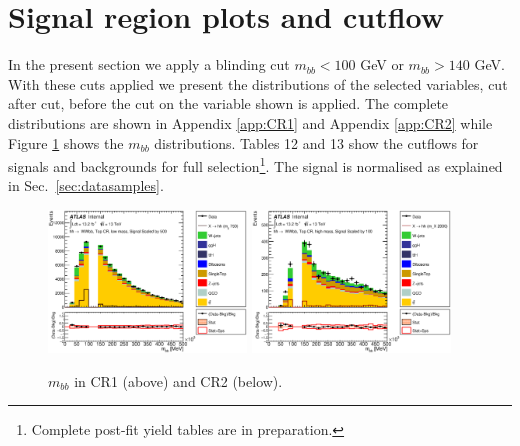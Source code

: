 \section{Signal region plots and cutflow}
\label{sec:dihiggs_plots_cut_flow}

In the present section we apply a blinding cut $m_{bb} < 100$ GeV or
$m_{bb} > 140$ GeV. With these cuts applied we present the distributions
of the selected variables, cut after cut, before the cut on the variable
shown is applied.  The complete distributions are shown in Appendix 
\ref{app:CR1} and Appendix \ref{app:CR2} while Figure \ref{fig:mbbCR1CR2}
shows the $m_{bb}$ distributions. 
Tables 12 and 13 show
the cutflows for signals and backgrounds for
full selection{\footnote{Complete post-fit yield tables are in preparation.}}. The signal is normalised as explained in Sec.~\ref{sec:datasamples}. 

\begin{figure}[!h]
\begin{center}
\includegraphics*[width=0.47\textwidth] {chapters/dihiggs/figures/ControlPlots/CR1/C_mBBcr_opt700_bbpt150_bbMass.eps}
\includegraphics*[width=0.47\textwidth] {chapters/dihiggs/figures/ControlPlots/CR2/C_mBBcr_opt2000_bbpt350_bbMass.eps}
\caption[$m_{bb}$ in CR1 and CR2.]{$m_{bb}$ in CR1 (above) and CR2 (below).  }
\label{fig:mbbCR1CR2}
\end{center}
\end{figure}


